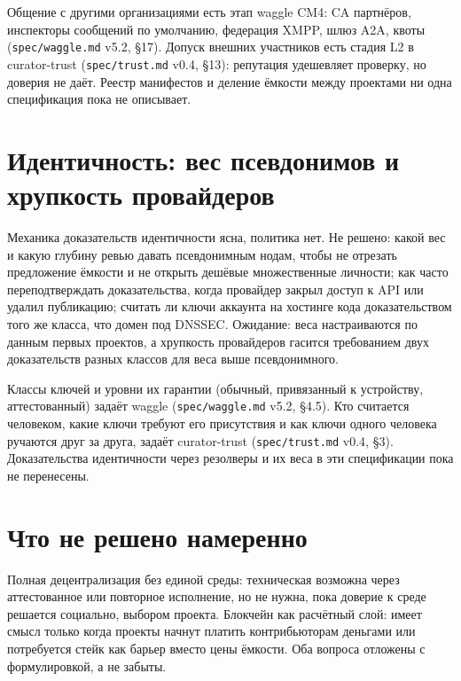  Общение с другими организациями есть этап waggle CM4: CA партнёров, инспекторы сообщений по умолчанию, федерация XMPP, шлюз A2A, квоты (\texttt{spec/waggle.md} v5.2, §17). Допуск внешних участников есть стадия L2 в curator-trust (\texttt{spec/trust.md} v0.4, §13): репутация удешевляет проверку, но доверия не даёт. Реестр манифестов и деление ёмкости между проектами ни одна спецификация пока не описывает.

\section{Идентичность: вес псевдонимов и хрупкость провайдеров}

Механика доказательств идентичности ясна, политика нет. Не решено: какой вес и какую глубину ревью давать псевдонимным нодам, чтобы не отрезать предложение ёмкости и не открыть дешёвые множественные личности; как часто переподтверждать доказательства, когда провайдер закрыл доступ к API или удалил публикацию; считать ли ключи аккаунта на хостинге кода доказательством того же класса, что домен под DNSSEC. Ожидание: веса настраиваются по данным первых проектов, а хрупкость провайдеров гасится требованием двух доказательств разных классов для веса выше псевдонимного.

 Классы ключей и уровни их гарантии (обычный, привязанный к устройству, аттестованный) задаёт waggle (\texttt{spec/waggle.md} v5.2, §4.5). Кто считается человеком, какие ключи требуют его присутствия и как ключи одного человека ручаются друг за друга, задаёт curator-trust (\texttt{spec/trust.md} v0.4, §3). Доказательства идентичности через резолверы и их веса в эти спецификации пока не перенесены.

\section{Что не решено намеренно}

Полная децентрализация без единой среды: техническая возможна через аттестованное или повторное исполнение, но не нужна, пока доверие к среде решается социально, выбором проекта. Блокчейн как расчётный слой: имеет смысл только когда проекты начнут платить контрибьюторам деньгами или потребуется стейк как барьер вместо цены ёмкости. Оба вопроса отложены с формулировкой, а не забыты.
